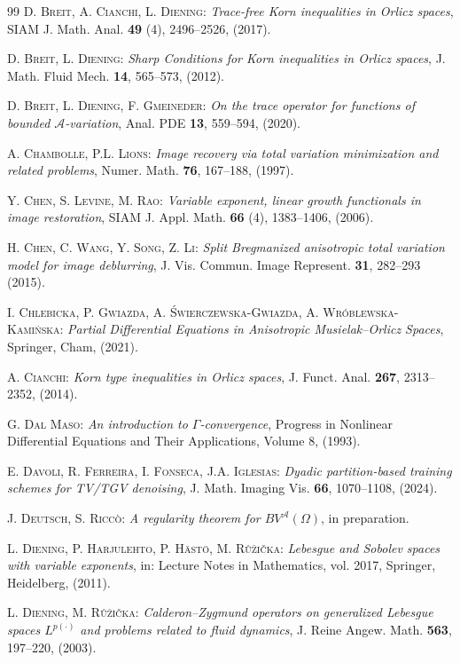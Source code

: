 \documentclass[a4paper,11pt,oneside,notitlepage]{article}
\numberwithin{equation}{section}
\begin{document}
\begin{thebibliography}{99}
 \textsc{D. Breit, A. Cianchi, L. Diening:} \emph{Trace-free Korn inequalities in Orlicz spaces}, SIAM J. Math. Anal. {\bf 49} (4), 2496--2526, (2017).

 \textsc{D. Breit, L. Diening:} \emph{Sharp Conditions for Korn inequalities in Orlicz spaces}, J. Math. Fluid Mech. {\bf 14}, 565--573, (2012).

 \textsc{D. Breit, L. Diening, F. Gmeineder:} \emph{On the trace operator for functions of bounded $\mathcal A$-variation}, Anal. PDE {\bf 13}, 559--594, (2020).

 \textsc{A. Chambolle, P.L. Lions:} \emph{Image recovery via total variation minimization and related problems}, Numer. Math. {\bf 76}, 167--188, (1997).

 \textsc{Y. Chen, S. Levine, M. Rao:} \emph{Variable exponent, linear growth functionals in image restoration}, SIAM J. Appl. Math. {\bf 66} (4), 1383--1406, (2006).

 \textsc{H. Chen, C. Wang, Y. Song, Z. Li:} \emph{Split Bregmanized anisotropic total variation model for image deblurring}, J. Vis. Commun. Image Represent. {\bf 31}, 282--293 (2015).

 \textsc{I. Chlebicka, P. Gwiazda, A. \'Swierczewska-Gwiazda, A. Wróblewska-Kami\'nska:} \emph{Partial Differential Equations in Anisotropic Musielak–Orlicz Spaces}, Springer, Cham, (2021).

 \textsc{A. Cianchi:} \emph{Korn type inequalities in Orlicz spaces}, J. Funct. Anal. {\bf 267}, 2313--2352, (2014).

 \textsc{G. Dal Maso:} \emph{An introduction to $\Gamma$-convergence}, Progress in Nonlinear Differential Equations and Their Applications, Volume 8, (1993).

 \textsc{E. Davoli, R. Ferreira, I. Fonseca, J.A. Iglesias:} \emph{Dyadic partition-based training schemes for TV/TGV denoising}, J. Math. Imaging Vis. {\bf 66}, 1070--1108, (2024).

 \textsc{J. Deutsch, S. Riccò:} \emph{A regularity theorem for $BV^{\mathcal A}(\Omega)$}, in preparation.

 \textsc{L. Diening, P. Harjulehto, P. H\"ast\"o, M. Rů\v zi\v cka:} \emph{Lebesgue and Sobolev spaces with variable exponents}, in: Lecture Notes in Mathematics, vol. 2017, Springer, Heidelberg, (2011).

 \textsc{L. Diening, M. Rů\v zi\v cka:} \emph{Calderon–Zygmund operators on generalized Lebesgue spaces $L^{p(\cdot)}$ and problems related to fluid dynamics}, J. Reine Angew. Math. {\bf 563}, 197--220, (2003).


\end{thebibliography}
\end{document}
